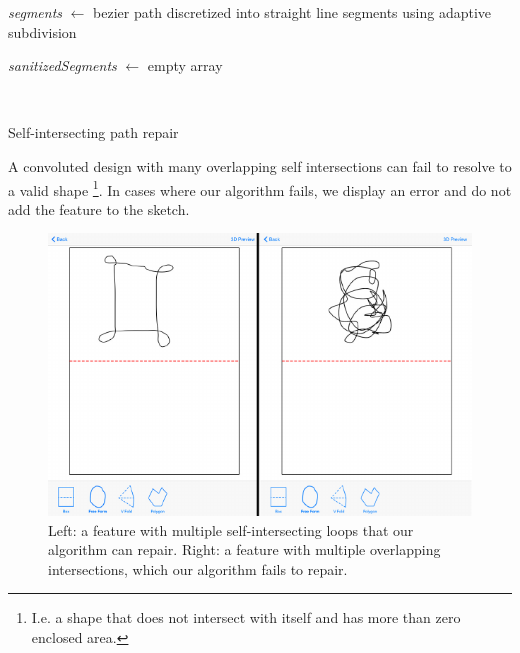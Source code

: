\begin{algorithm}[H]

 \textit{segments} $\leftarrow$ bezier path discretized into straight line segments using adaptive subdivision 
 
 \textit{sanitizedSegments} $\leftarrow$ empty array
  
 
  \
 
\caption{Self-intersecting path repair}
\end{algorithm}

A convoluted design with many overlapping self intersections can fail to
resolve to a valid shape \footnote{I.e. a shape that does not intersect
  with itself and has more than zero enclosed area.}. In cases where our
algorithm fails, we display an error and do not add the feature to the
sketch.

\begin{figure}[htbp]
\centering
\includegraphics{figures/41_Tech_Tool_Implementation/succeedFailSelfIntersections.pdf}
\caption{Left: a feature with multiple self-intersecting loops that our
algorithm can repair. Right: a feature with multiple overlapping
intersections, which our algorithm fails to repair.}
\end{figure}

